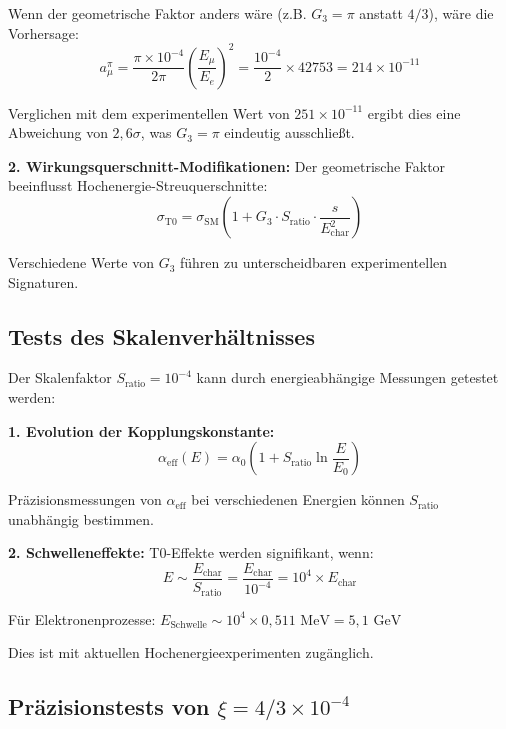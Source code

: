 \documentclass[12pt,a4paper]{report}
\begin{document}
	Wenn der geometrische Faktor anders wäre (z.B. $G_3 = \pi$ anstatt $4/3$), wäre die Vorhersage:
	\begin{equation}
		a_\mu^{\pi} = \frac{\pi \times 10^{-4}}{2\pi} \left(\frac{E_\mu}{E_e}\right)^2 = \frac{10^{-4}}{2} \times 42753 = 214 \times 10^{-11}
	\end{equation}
	
	Verglichen mit dem experimentellen Wert von $251 \times 10^{-11}$ ergibt dies eine Abweichung von $2,6\sigma$, was $G_3 = \pi$ eindeutig ausschließt.
	
	\textbf{2. Wirkungsquerschnitt-Modifikationen:}
	Der geometrische Faktor beeinflusst Hochenergie-Streuquerschnitte:
	\begin{equation}
		\sigma_{\text{T0}} = \sigma_{\text{SM}} \left(1 + G_3 \cdot S_{\text{ratio}} \cdot \frac{s}{E_{\text{char}}^2}\right)
	\end{equation}
	
	Verschiedene Werte von $G_3$ führen zu unterscheidbaren experimentellen Signaturen.
	
	\subsection{Tests des Skalenverhältnisses}
	\label{subsec:scale_ratio_tests}
	
	Der Skalenfaktor $S_{\text{ratio}} = 10^{-4}$ kann durch energieabhängige Messungen getestet werden:
	
	\textbf{1. Evolution der Kopplungskonstante:}
	\begin{equation}
		\alpha_{\text{eff}}(E) = \alpha_0 \left(1 + S_{\text{ratio}} \ln\frac{E}{E_0}\right)
	\end{equation}
	
	Präzisionsmessungen von $\alpha_{\text{eff}}$ bei verschiedenen Energien können $S_{\text{ratio}}$ unabhängig bestimmen.
	
	\textbf{2. Schwelleneffekte:}
	T0-Effekte werden signifikant, wenn:
	\begin{equation}
		E \sim \frac{E_{\text{char}}}{S_{\text{ratio}}} = \frac{E_{\text{char}}}{10^{-4}} = 10^4 \times E_{\text{char}}
	\end{equation}
	
	Für Elektronenprozesse: $E_{\text{Schwelle}} \sim 10^4 \times 0,511 \text{ MeV} = 5,1 \text{ GeV}$
	
	Dies ist mit aktuellen Hochenergieexperimenten zugänglich.
	
	\subsection{Präzisionstests von $\xi = 4/3 \times 10^{-4}$}
	\label{subsec:precision_tests}
	
\end{document}

